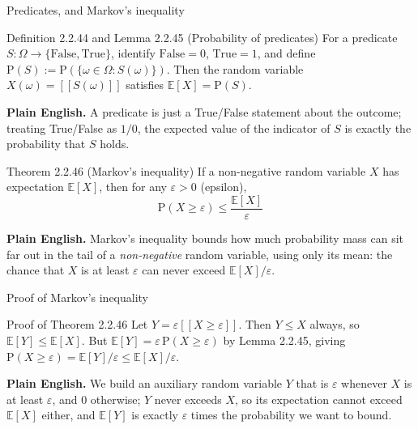 \documentclass[aspectratio=169,10pt]{beamer}
\begin{document}
\begin{frame}{Predicates, and Markov's inequality}
\begin{block}{Definition 2.2.44 and Lemma 2.2.45 (Probability of predicates)}
For a predicate $S:\Omega\to\{\text{False},\text{True}\}$, identify
$\text{False}=0$, $\text{True}=1$, and define
$\mathrm{P}(S):=\mathrm{P}(\{\omega\in\Omega:S(\omega)\})$. Then the random
variable $X(\omega)=[\![S(\omega)]\!]$ satisfies $\mathbb{E}[X]=\mathrm{P}(S)$.
\end{block}
\textbf{Plain English.} A predicate is just a True/False statement about the
outcome; treating True/False as $1/0$, the expected value of the indicator
of $S$ is exactly the probability that $S$ holds.

\begin{block}{Theorem 2.2.46 (Markov's inequality)}
If a non-negative random variable $X$ has expectation $\mathbb{E}[X]$, then
for any $\varepsilon>0$ (epsilon),
\[ \mathrm{P}(X\geq\varepsilon) \leq \frac{\mathbb{E}[X]}{\varepsilon} \]
\end{block}
\textbf{Plain English.} Markov's inequality bounds how much probability mass
can sit far out in the tail of a \emph{non-negative} random variable, using
only its mean: the chance that $X$ is at least $\varepsilon$ can never exceed
$\mathbb{E}[X]/\varepsilon$.
\end{frame}

\begin{frame}{Proof of Markov's inequality}
\begin{block}{Proof of Theorem 2.2.46}
Let $Y=\varepsilon[\![X\geq\varepsilon]\!]$. Then $Y\leq X$ always, so
$\mathbb{E}[Y]\leq\mathbb{E}[X]$. But $\mathbb{E}[Y]=\varepsilon\,\mathrm{P}(X\geq\varepsilon)$
by Lemma 2.2.45, giving $\mathrm{P}(X\geq\varepsilon)=\mathbb{E}[Y]/\varepsilon\leq\mathbb{E}[X]/\varepsilon$.
\end{block}
\textbf{Plain English.} We build an auxiliary random variable $Y$ that is
$\varepsilon$ whenever $X$ is at least $\varepsilon$, and $0$ otherwise; $Y$
never exceeds $X$, so its expectation cannot exceed $\mathbb{E}[X]$ either,
and $\mathbb{E}[Y]$ is exactly $\varepsilon$ times the probability we want to
bound.
\end{frame}
\end{document}
